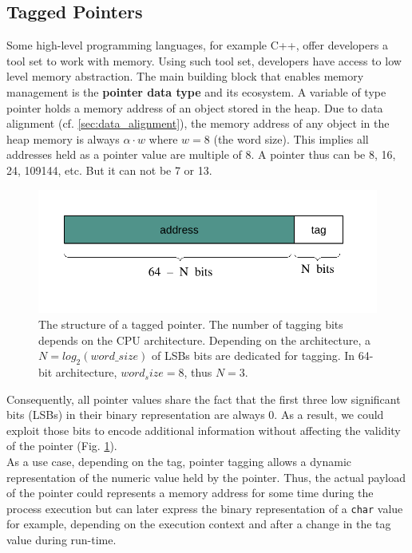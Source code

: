 \subsection{Tagged Pointers}
Some high-level programming languages, for example C++, offer developers a tool set to work with memory. Using such tool set, developers have access to low level memory abstraction. The main building block that enables memory management is the \textbf{pointer data type} and its ecosystem. A variable of type pointer holds a memory address of an object stored in the heap. Due to data alignment (cf. \ref{sec:data_alignment}), the memory address of any object in the heap memory is always $\alpha\cdot w$ where $w=8$ (the word size). This implies all addresses held as a pointer value are multiple of 8. A pointer thus can be 8, 16, 24, 109144, etc. But it can not be 7 or 13. \\

\begin{figure}
	\centering
	\includegraphics[scale=1]{figures/chapter2/pointervalue}
	\caption{The structure of a tagged pointer. The number of tagging bits depends on the CPU architecture. Depending on the architecture, a $ N = log_{2}(word\_size)$ of LSBs bits are dedicated for tagging. In 64-bit architecture, $word_size = 8$, thus $N = 3$.}
	\label{fig:tagged_pointer}
\end{figure}


Consequently, all pointer values share the fact that the first three low significant bits (LSBs) in their binary representation are always 0. As a result, we could exploit those bits to encode additional information without affecting the validity of the pointer (Fig. \ref{fig:tagged_pointer}).  \\ 

As a use case, depending on the tag, pointer tagging allows a dynamic representation of the numeric value held by the pointer. Thus, the actual payload of the pointer could represents a memory address for some time during the process execution but can later express the binary representation of a \texttt{char} value for example, depending on the execution context and after a change in the tag value during run-time. \\

